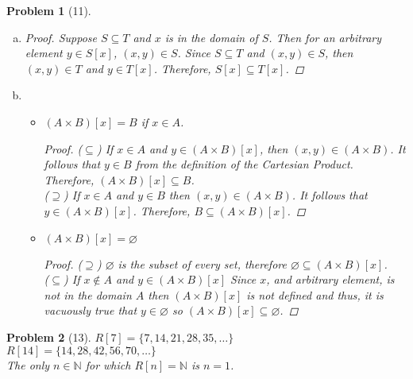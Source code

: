\documentclass{article}
\let\emptyset\varnothing
\theoremstyle{problem}
\newtheorem{prob}{Problem}
\theoremstyle{plain}
\theoremstyle{remark}
\begin{document}
\begin{prob}[11]\ \\[-1cm]
\begin{enumerate}[a)]
\item \begin{proof}
Suppose $S \subseteq T$ and $x$ is in the domain of $S$. Then for an arbitrary element $y \in S[x]$, $(x,y) \in S$. Since $S \subseteq T$ and $(x,y) \in S$, then $(x,y) \in T$ and $y \in T[x]$. Therefore, $S[x] \subseteq T[x]$.
\end{proof}
\item \begin{itemize}
    \item $(A \times B)[x] = B$ if $x \in A$. 
\begin{proof}
($\subseteq$) If $x \in A$ and $y \in (A \times B)[x]$, then $(x,y) \in (A \times B)$. It follows that $y \in B$ from the definition of the Cartesian Product. Therefore, $(A \times B)[x] \subseteq B$.\\
($\supseteq$) If $x \in A$ and $y \in B$ then $(x,y) \in (A \times B)$. It follows that $y \in (A \times B)[x]$. Therefore, $B \subseteq (A \times B)[x]$.
\end{proof}
\item $(A \times B)[x] = \emptyset$
\begin{proof}
($\supseteq$) $\emptyset$ is the subset of every set, therefore $\emptyset \subseteq (A \times B)[x]$.\\
($\subseteq$) If $x \not \in A$ and $y \in (A \times B)[x]$ Since $x$, and arbitrary element, is not in the domain $A$ then $(A \times B)[x]$ is not defined and thus, it is vacuously true that $y \in \emptyset$ so $(A \times B)[x] \subseteq \emptyset$.
\end{proof}
\end{itemize}
\end{enumerate}
\end{prob}
%

\begin{prob}[13]
$R[7] = \{7,14,21,28,35,\ldots \}$
\\[5pt]
$R[14] = \{14,28,42,56,70,\ldots \}$
\\[5pt]
The only $n \in \mathbb{N}$ for which $R[n] = \mathbb{N}$ is $n = 1$.

\end{prob}
%
\end{document}
